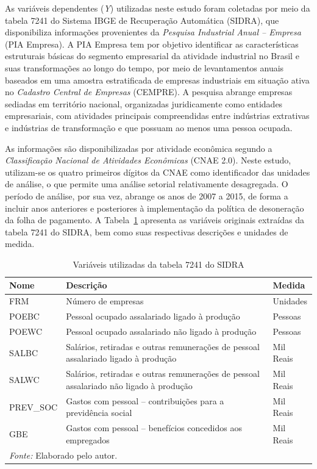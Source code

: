 \documentclass[12pt,a4paper,oneside]{article}
\begin{document}
As variáveis dependentes (\textit{Y}) utilizadas neste estudo foram coletadas por meio da tabela 7241 do Sistema IBGE de Recuperação Automática (SIDRA), que disponibiliza informações provenientes da \textit{Pesquisa Industrial Anual – Empresa} (PIA Empresa). A PIA Empresa tem por objetivo identificar as características estruturais básicas do segmento empresarial da atividade industrial no Brasil e suas transformações ao longo do tempo, por meio de levantamentos anuais baseados em uma amostra estratificada de empresas industriais em situação ativa no \textit{Cadastro Central de Empresas} (CEMPRE). A pesquisa abrange empresas sediadas em território nacional, organizadas juridicamente como entidades empresariais, com atividades principais compreendidas entre indústrias extrativas e indústrias de transformação e que possuam ao menos uma pessoa ocupada.

As informações são disponibilizadas por atividade econômica segundo a \textit{Classificação Nacional de Atividades Econômicas} (CNAE 2.0). Neste estudo, utilizam-se os quatro primeiros dígitos da CNAE como identificador das unidades de análise, o que permite uma análise setorial relativamente desagregada. O período de análise, por sua vez, abrange os anos de 2007 a 2015, de forma a incluir anos anteriores e posteriores à implementação da política de desoneração da folha de pagamento. A Tabela~\ref{tab:variables} apresenta as variáveis originais extraídas da tabela 7241 do SIDRA, bem como suas respectivas descrições e unidades de medida.

\begin{table}[H]
	\centering
	\caption{Variáveis utilizadas da tabela 7241 do SIDRA}
	\label{tab:variables}
	\begin{tabular}{|l|p{8cm}|l|}
		\hline
		\textbf{Nome} & \textbf{Descrição} & \textbf{Medida} \\
		\hline
		FRM       & Número de empresas                                           & Unidades      \\
		\hline
		POEBC     & Pessoal ocupado assalariado ligado à produção               & Pessoas       \\
		\hline
		POEWC     & Pessoal ocupado assalariado não ligado à produção           & Pessoas       \\
		\hline
		SALBC     & Salários, retiradas e outras remunerações de pessoal assalariado ligado à produção & Mil Reais \\
		\hline
		SALWC     & Salários, retiradas e outras remunerações de pessoal assalariado não ligado à produção & Mil Reais \\
		\hline
		PREV\_SOC & Gastos com pessoal – contribuições para a previdência social & Mil Reais \\
		\hline
		GBE       & Gastos com pessoal – benefícios concedidos aos empregados  & Mil Reais \\
		\hline
		\multicolumn{3}{l}{\footnotesize \textit{Fonte:} Elaborado pelo autor.} \\
	\end{tabular}
\end{table}
\end{document}
